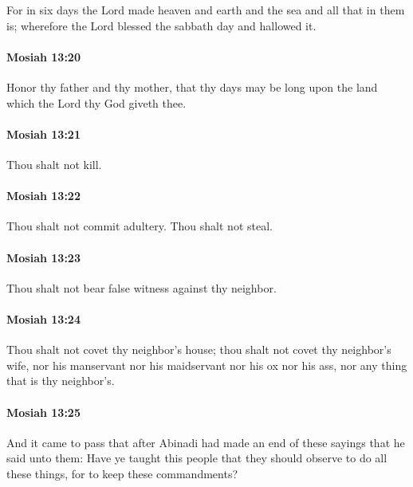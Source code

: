 			For in six days the Lord made heaven and earth and the sea and all that in them is;
			wherefore the Lord blessed the sabbath day and hallowed it.

		\paragraph{Mosiah 13:20} %
			\label{MOSIAH-13-20}

			Honor thy father and thy mother,
			that thy days may be long upon the land
			which the Lord thy God giveth thee.

		\paragraph{Mosiah 13:21} %
			\label{MOSIAH-13-21}

			Thou shalt not kill.

		\paragraph{Mosiah 13:22} %
			\label{MOSIAH-13-22}

			Thou shalt not commit adultery.
			Thou shalt not steal.

		\paragraph{Mosiah 13:23} %
			\label{MOSIAH-13-23}

			Thou shalt not bear false witness against thy neighbor.

		\paragraph{Mosiah 13:24} %
			\label{MOSIAH-13-24}

			Thou shalt not covet thy neighbor's house;
			thou shalt not covet thy neighbor's wife,
			nor his manservant nor his maidservant nor his ox nor his ass,
			nor any thing that is thy neighbor's.

		\paragraph{Mosiah 13:25} %
			\label{MOSIAH-13-25}

			And it came to pass that
			after Abinadi had made an end of these sayings
			that he said unto them:
			Have ye taught this people that they should observe to do all these things,
			for to keep these commandments?

